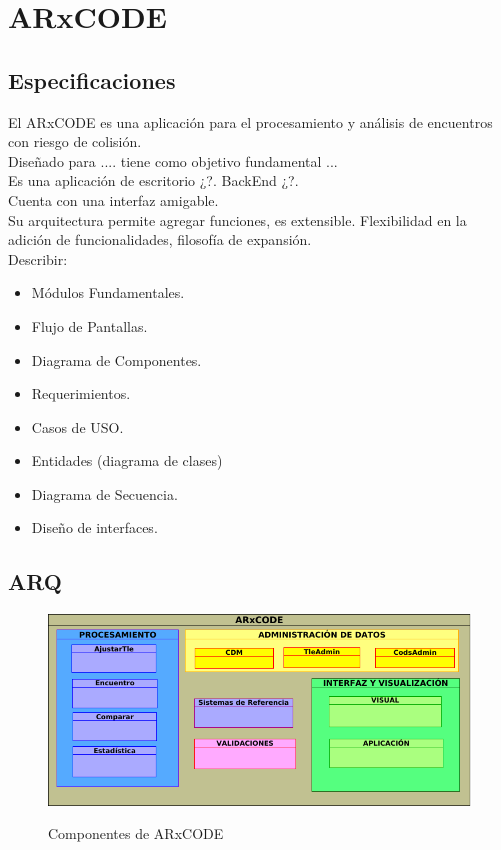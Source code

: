 \chapter{ARxCODE}
\label{chap:arxcode} 

\section{Especificaciones}
El ARxCODE es una aplicaci\'on para el procesamiento y an\'alisis de encuentros con riesgo de colisi\'on.\\
Dise\~nado para .... tiene como objetivo fundamental ...\\
Es una aplicaci\'on de escritorio ¿?. BackEnd ¿?.\\
Cuenta con una interfaz amigable.\\
Su arquitectura permite agregar funciones, es extensible. Flexibilidad en la adici\'on de funcionalidades, filosof\'ia de expansi\'on.\\
Describir:
\begin{itemize}
 \item  M\'odulos Fundamentales.
 \item Flujo de Pantallas.
 \item Diagrama de Componentes.
 \item Requerimientos.
 \item Casos de USO.
 \item Entidades (diagrama de clases)
 \item Diagrama de Secuencia.
 \item Dise\~no de interfaces.
\end{itemize}

\section{ARQ}
\begin{figure}[h!]
  \centering
  \includegraphics[width=.5\textwidth]{imagenes/componentesAR}
  \label{fig:componentes}
  \caption{Componentes de ARxCODE}
\end{figure}


